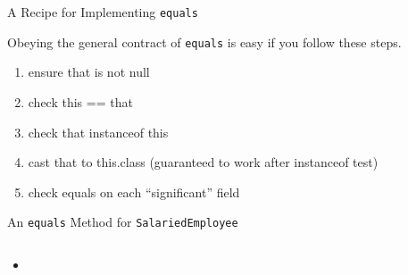 \documentclass{beamer}
\begin{document}
\begin{frame}[fragile]{A Recipe for Implementing {\tt equals}}


Obeying the general contract of {\tt equals} is easy if you follow these steps.\\

\begin{enumerate}
\item ensure that is not null
\item check this == that
\item check that instanceof this
\item cast that to this.class (guaranteed to work after instanceof test)
\item check equals on each ``significant'' field
\end{enumerate}


\end{frame}

\begin{frame}[fragile]{An {\tt equals} Method for {\tt SalariedEmployee}}


\begin{lstlisting}[language=Java]

\end{lstlisting}

\begin{itemize}
\item
\end{itemize}


\end{frame}










\end{document}
